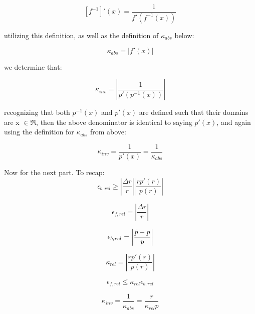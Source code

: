 \documentclass{article}
\begin{document}
\begin{equation}
    \left[f^{-1}\right]'(x) = \frac{1}{f'(f^{-1}(x))}
\end{equation}

utilizing this definition, as well as the definition of $\kappa_{abs}$ below:

\begin{equation}
    \kappa_{abs} = \left| f'(x) \right|
\end{equation}

we determine that:

\begin{equation}
    \kappa_{inv} = \left| \frac{1}{p'(p^{-1}(x))} \right|
\end{equation}

recognizing that both $p^{-1}(x)$ and $p'(x)$ are defined such that their domains are x $\in \Re$, then the above denominator is identical to saying $p'(x)$, and again using the definition for $\kappa_{abs}$ from above:

\begin{equation}
    \kappa_{inv} = \frac{1}{p'(x)} = \frac{1}{\kappa_{abs}}
\end{equation}

\quad

\quad

Now for the next part. To recap:
\begin{equation}
    \epsilon_{b,rel} \geq \left|\frac{\Delta r}{r}\right|\left| \frac{r p'(r)}{p(r)}\right|
    \label{q1end}
\end{equation}

\begin{equation}
    \epsilon_{f,rel} = \left|\frac{\Delta r}{r}\right|
    \label{epsfrel}
\end{equation}

\begin{equation}
    \epsilon_{b,rel} = \left|\frac{\Tilde{p} - p}{p}\right|
    \label{epsbrel}
\end{equation}

\begin{equation}
    \kappa_{rel} = \left| \frac{r p'(r)}{p(r)}\right|
    \label{kapreldef}
\end{equation}

\begin{equation}
    \epsilon_{f,rel} \leq \kappa_{rel} \epsilon_{b,rel}
    \label{kappadef}
\end{equation}

\begin{equation}
    \kappa_{inv}=\frac{1}{\kappa_{abs}}=\frac{r}{\kappa_{rel} p}
    \label{kappainvdef}
\end{equation}
\end{document}
